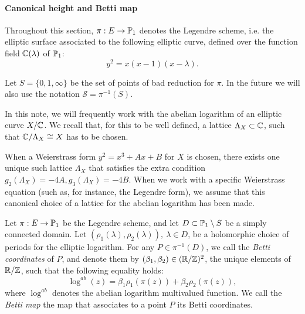 \documentclass[a4paper,12pt]{article}
\theoremstyle{remark}
\begin{document}
\paragraph{Canonical height and Betti map}

Throughout this section, $\pi:E \rightarrow \P_1$ denotes the Legendre scheme, i.e. the elliptic surface associated to the following elliptic curve, defined over the function field $\C(\lambda)$ of $\P_1$:
\[
y^2=x(x-1)(x-\lambda).
\]

Let $S=\{0,1,\infty\}$ be the set of points of bad reduction for $\pi$. In the future we will also use the notation $\mathcal{S}=\pi^{-1}(S)$. 

	In this note, we will frequently work with the abelian logarithm of an elliptic curve $X/\C$. We recall that, for this to be well defined, a lattice $\Lambda_X \subset \C$, such that $\C/\Lambda_X \cong X$ has to be chosen. 
	
	\begin{remark}\label{Rmk:weierstrass}
			When a Weierstrass form $y^2=x^3+Ax+B$ for $X$ is chosen, there exists one unique such lattice $\Lambda_X$ that satisfies the extra condition $g_2(\Lambda_X)=-4A, g_3(\Lambda_X)=-4B$. When we work with a specific Weierstrass equation (such as, for instance, the Legendre form), we assume that this canonical choice of a lattice for the abelian logarithm has been made.
	\end{remark}
	


\begin{definition}\label{bettidef}
Let $\pi:E \rightarrow \P_1$ be the Legendre scheme, and let $D \subset \P_1 \setminus S$ be a simply connected domain. Let $(\rho_1(\lambda),\rho_2(\lambda)), \ \lambda \in D$, be a holomorphic choice of periods for the elliptic logarithm. For any $P \in \pi^{-1}(D)$, we call the \textit{Betti coordinates} of $P$, and denote them by $(\beta_1,\beta_2) \in (\R/\Z)^2$, the unique elements of $\R/\Z$, such that the following equality holds:
\[
\log^{ab}(z)=\beta_1\rho_1(\pi(z))+\beta_2\rho_2(\pi(z)),
\]
where $\log^{ab}$ denotes the abelian logarithm multivalued function. We call the \textit{Betti map} the map that associates to a point $P$ its Betti coordinates.
\end{definition}
\end{document}
